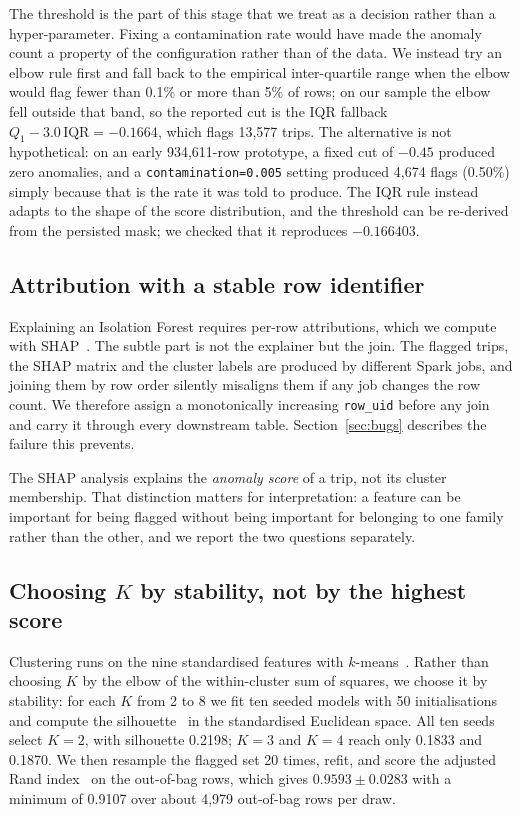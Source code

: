 \documentclass[11pt,a4paper]{article}
\newcommand{\code}[1]{\texttt{\small #1}}
\begin{document}
The threshold is the part of this stage that we treat as a decision rather than a hyper-parameter. Fixing a contamination rate would have made the anomaly count a property of the configuration rather than of the data. We instead try an elbow rule first and fall back to the empirical inter-quartile range when the elbow would flag fewer than 0.1\% or more than 5\% of rows; on our sample the elbow fell outside that band, so the reported cut is the IQR fallback $Q_1 - 3.0\,\mathrm{IQR} = -0.1664$, which flags 13{,}577 trips. The alternative is not hypothetical: on an early 934{,}611-row prototype, a fixed cut of $-0.45$ produced zero anomalies, and a \code{contamination=0.005} setting produced 4{,}674 flags (0.50\%) simply because that is the rate it was told to produce. The IQR rule instead adapts to the shape of the score distribution, and the threshold can be re-derived from the persisted mask; we checked that it reproduces $-0.166403$.

\subsection{Attribution with a stable row identifier}

Explaining an Isolation Forest requires per-row attributions, which we compute with SHAP~\cite{lundberg2017}. The subtle part is not the explainer but the join. The flagged trips, the SHAP matrix and the cluster labels are produced by different Spark jobs, and joining them by row order silently misaligns them if any job changes the row count. We therefore assign a monotonically increasing \code{row\_uid} before any join and carry it through every downstream table. Section~\ref{sec:bugs} describes the failure this prevents.

The SHAP analysis explains the \emph{anomaly score} of a trip, not its cluster membership. That distinction matters for interpretation: a feature can be important for being flagged without being important for belonging to one family rather than the other, and we report the two questions separately.

\subsection{Choosing \texorpdfstring{$K$}{K} by stability, not by the highest score}

Clustering runs on the nine standardised features with $k$-means~\cite{macqueen1967,arthur2007}. Rather than choosing $K$ by the elbow of the within-cluster sum of squares, we choose it by stability: for each $K$ from 2 to 8 we fit ten seeded models with 50 initialisations and compute the silhouette~\cite{rousseeuw1987} in the standardised Euclidean space. All ten seeds select $K=2$, with silhouette 0.2198; $K=3$ and $K=4$ reach only 0.1833 and 0.1870. We then resample the flagged set 20 times, refit, and score the adjusted Rand index~\cite{hubert1985} on the out-of-bag rows, which gives $0.9593 \pm 0.0283$ with a minimum of 0.9107 over about 4{,}979 out-of-bag rows per draw.
\end{document}

